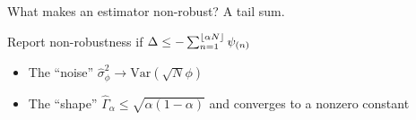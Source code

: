
\begin{frame}{What makes an estimator non-robust?  A tail sum.}

Report non-robustness if
$ \Delta \le
  -\sum_{n=1}^{\lfloor \alpha N \rfloor} \psi_{(n)}$
%
\begin{itemize}
\item<6-> The ``noise'' $\hat\sigma_\phi^2 \rightarrow \mathrm{Var}(\sqrt{N}\phi)$
    \citep{hampel1986robustbook}
\item<7-> The ``shape'' $\hat\Gamma_\alpha \le \sqrt{\alpha (1 - \alpha)}$
    and converges to a nonzero constant
\end{itemize}


\end{frame}
